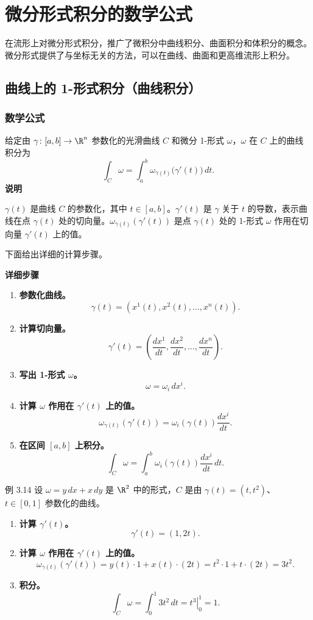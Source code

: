 \section{微分形式积分的数学公式}
\label{sec:3.6}
在流形上对微分形式积分，推广了微积分中曲线积分、曲面积分和体积分的概念。微分形式提供了与坐标无关的方法，可以在曲线、曲面和更高维流形上积分。

\subsection{曲线上的 1-形式积分（曲线积分）}
\subsubsection{数学公式}
给定由 $\gamma\colon[a,b]\to\R^n$ 参数化的光滑曲线 $C$ 和微分 1-形式 $\omega$，$\omega$ 在 $C$ 上的曲线积分为
\[
  \int_C\omega=\int_a^b\omega_{\gamma(t)}\bigl(\gamma'(t)\bigr)\,dt.
\]
\noindent\textbf{说明}\par
$\gamma(t)$ 是曲线 $C$ 的参数化，其中 $t\in[a,b]$。$\gamma'(t)$ 是 $\gamma$ 关于 $t$ 的导数，表示曲线在点 $\gamma(t)$ 处的切向量。$\omega_{\gamma(t)}(\gamma'(t))$ 是点 $\gamma(t)$ 处的 1-形式 $\omega$ 作用在切向量 $\gamma'(t)$ 上的值。

下面给出详细的计算步骤。

\noindent\textbf{详细步骤}
\begin{enumerate}
\item \textbf{参数化曲线。}
\[
  \gamma(t)=(x^1(t),x^2(t),\dots,x^n(t)).
\]
\item \textbf{计算切向量。}
\[
  \gamma'(t)=\left(\frac{dx^1}{dt},\frac{dx^2}{dt},\dots,\frac{dx^n}{dt}\right).
\]
\item \textbf{写出 1-形式 $\omega$。}
\[
  \omega=\omega_i\,dx^i.
\]
\item \textbf{计算 $\omega$ 作用在 $\gamma'(t)$ 上的值。}
\[
  \omega_{\gamma(t)}(\gamma'(t))=\omega_i(\gamma(t))\frac{dx^i}{dt}.
\]
\item \textbf{在区间 $[a,b]$ 上积分。}
\[
  \int_C\omega=\int_a^b\omega_i(\gamma(t))\frac{dx^i}{dt}\,dt.
\]
\end{enumerate}

\begin{statement}{例 3.14}{}
设 $\omega=y\,dx+x\,dy$ 是 $\R^2$ 中的形式，$C$ 是由 $\gamma(t)=(t,t^2)$、$t\in[0,1]$ 参数化的曲线。
\begin{enumerate}
\item \textbf{计算 $\gamma'(t)$。}
\[
  \gamma'(t)=(1,2t).
\]
\item \textbf{计算 $\omega$ 作用在 $\gamma'(t)$ 上的值。}
\[
  \omega_{\gamma(t)}(\gamma'(t))=y(t)\cdot 1+x(t)\cdot(2t)
    =t^2\cdot 1+t\cdot(2t)=3t^2.
\]
\item \textbf{积分。}
\[
  \int_C\omega=\int_0^1 3t^2\,dt=\left.t^3\right|_0^1=1.
\]
\end{enumerate}
\end{statement}

